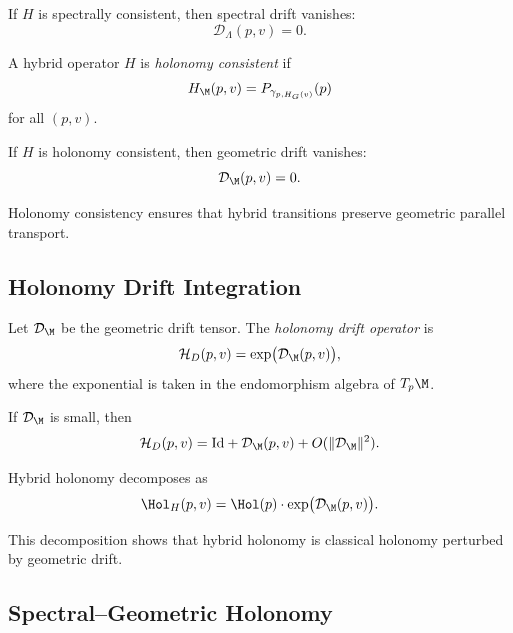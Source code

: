 \begin{lemma}
If $H$ is spectrally consistent, then spectral drift vanishes:
\[
\mathcal{D}_\Lambda(p,v) = 0.
\]
\end{lemma}

\begin{definition}
A hybrid operator $H$ is \emph{holonomy consistent} if
\[
H_\M(p,v) = P_{\gamma_{p,H_G(v)}}(p)
\]
for all $(p,v)$.
\end{definition}

\begin{lemma}
If $H$ is holonomy consistent, then geometric drift vanishes:
\[
\mathcal{D}_\M(p,v) = 0.
\]
\end{lemma}

\begin{remark}
Holonomy consistency ensures that hybrid transitions preserve geometric
parallel transport.
\end{remark}

\subsection{Holonomy Drift Integration}

\begin{definition}
Let $\mathcal{D}_\M$ be the geometric drift tensor.  
The \emph{holonomy drift operator} is
\[
\mathcal{H}_D(p,v)
= \exp\!\big( \mathcal{D}_\M(p,v) \big),
\]
where the exponential is taken in the endomorphism algebra of $T_p\M$.
\end{definition}

\begin{lemma}
If $\mathcal{D}_\M$ is small, then
\[
\mathcal{H}_D(p,v)
= \mathrm{Id} + \mathcal{D}_\M(p,v) + O(\|\mathcal{D}_\M\|^2).
\]
\end{lemma}

\begin{theorem}
Hybrid holonomy decomposes as
\[
\Hol_H(p,v)
= \Hol(p) \cdot \exp\!\big( \mathcal{D}_\M(p,v) \big).
\]
\end{theorem}

\begin{remark}
This decomposition shows that hybrid holonomy is classical holonomy
perturbed by geometric drift.
\end{remark}

\subsection{Spectral--Geometric Holonomy}

